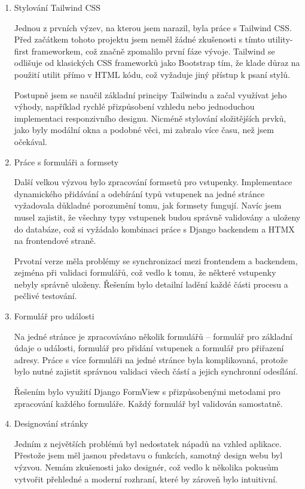 \documentclass[12pt, a4paper,
twoside,        %
openright
]{report}
\begin{document}
\begin{enumerate}
	\item{Stylování Tailwind CSS}
	
	Jednou z prvních výzev, na kterou jsem narazil, byla práce s Tailwind CSS. Před začátkem tohoto projektu jsem neměl žádné zkušenosti s tímto utility-first frameworkem, což značně zpomalilo první fáze vývoje. Tailwind se odlišuje od klasických CSS frameworků jako Bootstrap tím, že klade důraz na použití utilit přímo v HTML kódu, což vyžaduje jiný přístup k psaní stylů.
	
	Postupně jsem se naučil základní principy Tailwindu a začal využívat jeho výhody, například rychlé přizpůsobení vzhledu nebo jednoduchou implementaci responzivního designu. Nicméně stylování složitějších prvků, jako byly modální okna a podobné věci, mi zabralo více času, než jsem očekával.
	
	\item{Práce s formuláři a formsety}
	
	Další velkou výzvou bylo zpracování formsetů pro vstupenky. Implementace dynamického přidávání a odebírání typů vstupenek na jedné stránce vyžadovala důkladné porozumění tomu, jak formsety fungují. Navíc jsem musel zajistit, že všechny typy vstupenek budou správně validovány a uloženy do databáze, což si vyžádalo kombinaci práce s Django backendem a HTMX na frontendové straně.
	
	Prvotní verze měla problémy se synchronizací mezi frontendem a backendem, zejména při validaci formulářů, což vedlo k tomu, že některé vstupenky nebyly správně uloženy. Řešením bylo detailní ladění každé části procesu a pečlivé testování.
	
	\item{Formulář pro události}
	
	Na jedné stránce je zpracováváno několik formulářů – formulář pro základní údaje o události, formulář pro přidání vstupenek a formulář pro přiřazení adresy. Práce s více formuláři na jedné stránce byla komplikovaná, protože bylo nutné zajistit správnou validaci všech částí a jejich synchronní odesílání.
	
	Řešením bylo využití Django FormView s přizpůsobenými metodami pro zpracování každého formuláře. Každý formulář byl validován samostatně.
	
	\item{Designování stránky}
	
	Jedním z největších problémů byl nedostatek nápadů na vzhled aplikace. Přestože jsem měl jasnou představu o funkcích, samotný design webu byl výzvou. Nemám zkušenosti jako designér, což vedlo k několika pokusům vytvořit přehledné a moderní rozhraní, které by zároveň bylo intuitivní.
	

\end{enumerate}
\end{document}

